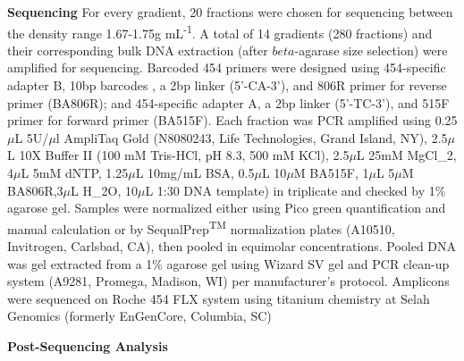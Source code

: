 \textbf{Sequencing}  For every gradient, 20 fractions were chosen for sequencing between the density range 1.67-1.75g mL\textsuperscript{-1}. A total of 14 gradients (280 fractions) and their corresponding bulk DNA extraction (after $beta$-agarase size selection) were amplified for sequencing. Barcoded 454 primers were designed using 454-specific adapter B, 10bp barcodes \cite{Hamady_2008}, a 2bp linker (5'-CA-3'), and 806R primer for reverse primer (BA806R); and 454-specific adapter A, a 2bp linker (5'-TC-3'), and 515F primer for forward primer (BA515F). Each fraction was PCR amplified using 0.25$\mu$L 5U/$\mu$l AmpliTaq Gold (N8080243, Life Technologies, Grand Island, NY), 2.5$\mu$L 10X Buffer II (100 mM Tris-HCl, pH 8.3, 500 mM KCl), 2.5$\mu$L 25mM MgCl_{2}, 4$\mu$L 5mM dNTP, 1.25$\mu$L 10mg/mL BSA, 0.5$\mu$L 10$\mu$M BA515F, 1$\mu$L 5$\mu$M BA806R,3$\mu$L H_{2}O, 10$\mu$L 1:30 DNA template) in triplicate and checked by 1\% agarose gel. Samples were normalized either using Pico green quantification and manual calculation or by SequalPrep\textsuperscript{TM} normalization plates (A10510, Invitrogen, Carlsbad, CA), then pooled in equimolar concentrations. Pooled DNA was gel extracted from a 1\% agarose gel using Wizard SV gel and PCR clean-up system (A9281, Promega, Madison, WI) per manufacturer's protocol.  Amplicons were sequenced on Roche 454 FLX system using titanium chemistry at Selah Genomics (formerly EnGenCore, Columbia, SC)    

\textbf{Post-Sequencing Analysis}
 